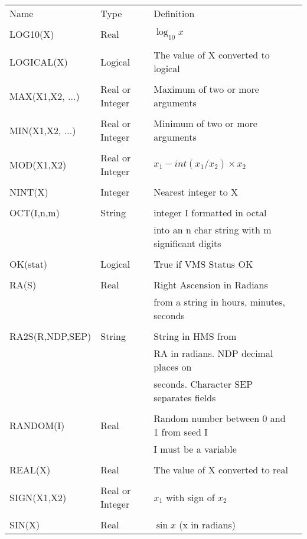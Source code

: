 \newpage
\begin{center}
\begin{tabular}{llll}
Name & Type & Definition \\
\\
LOG10(X) & Real & $\log_{10} x $\\
\\
LOGICAL(X) & Logical & The value of X converted to logical \\
\\
MAX(X1,X2, ...) & Real or Integer & Maximum of two or more arguments \\
\\
MIN(X1,X2, ...) & Real or Integer & Minimum of two or more arguments \\
\\
MOD(X1,X2) & Real or Integer & $x_{1} - int(x_{1}/x_{2}) \times x_{2}$ \\
\\
NINT(X) & Integer & Nearest integer to X \\
\\
OCT(I,n,m) & String & integer I formatted in octal \\
 & & into an n char string with m significant digits \\
\\
OK(stat) & Logical & True if VMS Status OK \\
\\
RA(S) & Real & Right Ascension in Radians \\
  & & from a string in hours, minutes, seconds \\
\\                                                       
RA2S(R,NDP,SEP) & String & String in HMS from \\
  & & RA in radians. NDP decimal places on \\
  & & seconds. Character SEP separates fields \\
\\
RANDOM(I) & Real & Random number between 0 and 1 from seed I \\
     & &  I must be a variable \\
\\
REAL(X) & Real & The value of X converted to real\\
\\
SIGN(X1,X2) & Real or Integer & $x_{1}$ with sign of $x_{2}$ \\
\\
SIN(X) & Real & $\sin x$ (x in radians) \\

\end{tabular}
\end{center}
